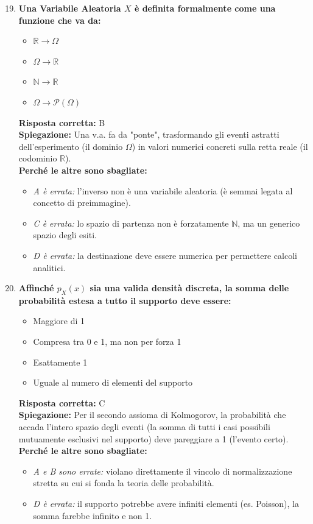 \documentclass[12pt, a4paper]{article}
\begin{document}
\begin{enumerate}[label=\textbf{\arabic*.}]
\setcounter{enumi}{18}
    \item \textbf{Una Variabile Aleatoria $X$ è definita formalmente come una funzione che va da:}
    \begin{itemize}
        \item[A)] $\mathbb{R} \rightarrow \Omega$
        \item[B)] $\Omega \rightarrow \mathbb{R}$
        \item[C)] $\mathbb{N} \rightarrow \mathbb{R}$
        \item[D)] $\Omega \rightarrow \mathcal{P}(\Omega)$
    \end{itemize}
    \textbf{Risposta corretta:} B \\
    \textbf{Spiegazione:} Una v.a. fa da "ponte", trasformando gli eventi astratti dell'esperimento (il dominio $\Omega$) in valori numerici concreti sulla retta reale (il codominio $\mathbb{R}$). \\
    \textbf{Perché le altre sono sbagliate:}
    \begin{itemize}
        \item \textit{A è errata:} l'inverso non è una variabile aleatoria (è semmai legata al concetto di preimmagine).
        \item \textit{C è errata:} lo spazio di partenza non è forzatamente $\mathbb{N}$, ma un generico spazio degli esiti.
        \item \textit{D è errata:} la destinazione deve essere numerica per permettere calcoli analitici.
    \end{itemize}

    \item \textbf{Affinché $p_X(x)$ sia una valida densità discreta, la somma delle probabilità estesa a tutto il supporto deve essere:}
    \begin{itemize}
        \item[A)] Maggiore di 1
        \item[B)] Compresa tra 0 e 1, ma non per forza 1
        \item[C)] Esattamente 1
        \item[D)] Uguale al numero di elementi del supporto
    \end{itemize}
    \textbf{Risposta corretta:} C \\
    \textbf{Spiegazione:} Per il secondo assioma di Kolmogorov, la probabilità che accada l'intero spazio degli eventi (la somma di tutti i casi possibili mutuamente esclusivi nel supporto) deve pareggiare a 1 (l'evento certo). \\
    \textbf{Perché le altre sono sbagliate:}
    \begin{itemize}
        \item \textit{A e B sono errate:} violano direttamente il vincolo di normalizzazione stretta su cui si fonda la teoria delle probabilità.
        \item \textit{D è errata:} il supporto potrebbe avere infiniti elementi (es. Poisson), la somma farebbe infinito e non 1.
    \end{itemize}


\end{enumerate}
\end{document}

